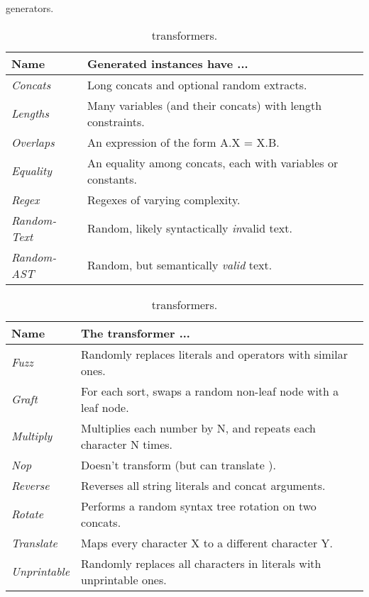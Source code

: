 \begin{table}[t]
    \centering
    \caption{\generator{} generators.}
    \label{tbl:generators}
    \begin{tabular}{|l|l|}
        \hline
        \textbf{Name}
            & \textbf{Generated instances have ...}
            \\ \hline
        \textit{Concats}
            & Long concats and optional random extracts.
            \\ \hline
        \textit{Lengths}
            & Many variables (and their concats) with length constraints.
            \\ \hline
        \textit{Overlaps}
            & An expression of the form A.X = X.B.
            \\ \hline
        \textit{Equality}
            & An equality among concats, each with variables or constants.
            \\ \hline
        \textit{Regex}
            & Regexes of varying complexity.
            \\ \hline
        \textit{Random-Text}
            & Random, likely syntactically \textit{in}valid text.
            \\ \hline
        \textit{Random-AST}
            & Random, but semantically \textit{valid} text.
            \\ \hline
    \end{tabular}

    \caption{\transformer{} transformers.}
    \label{tbl:transformers}
    \begin{tabular}{|l|l|}
        \hline
        \textbf{Name}
            & \textbf{The transformer ...}
            \\ \hline
        \textit{Fuzz}
            & Randomly replaces literals and operators with similar ones.
            \\ \hline
        \textit{Graft}
            & For each sort, swaps a random non-leaf node with a leaf node.
            \\ \hline
        \textit{Multiply}
            & Multiplies each number by N, and repeats each character N times.
            \\ \hline
        \textit{Nop}
            & Doesn't transform (but can translate \smtfull{}).
            \\ \hline
        \textit{Reverse}
            & Reverses all string literals and concat arguments.
            \\ \hline
        \textit{Rotate}
            & Performs a random syntax tree rotation on two concats.
            \\ \hline
        \textit{Translate}
            & Maps every character X to a different character Y.
            \\ \hline
        \textit{Unprintable}
            & Randomly replaces all characters in literals with unprintable ones.
            \\ \hline
    \end{tabular}
\end{table}

